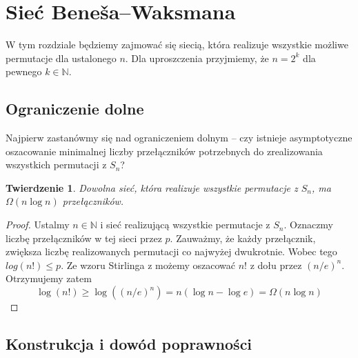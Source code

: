 \documentclass[a4paper]{article}
\newcommand{\todo}[1]{\begin{center} \fbox{TODO: #1} \end{center}}
\newcommand{\N}{\mathbb{N}}
\newtheorem{tw}{Twierdzenie}[section]
\theoremstyle{definition}
\newtheorem*{pyt}{Pytanie}
\begin{document}

\section{Sieć Beneša--Waksmana}

W tym rozdziale będziemy zajmować się siecią, która realizuje wszystkie możliwe permutacje dla ustalonego \(n\). Dla uproszczenia przyjmiemy, że $n = 2^k$ dla pewnego \(k \in \N\).


\subsection{Ograniczenie dolne}

Najpierw zastanówmy się nad ograniczeniem dolnym -- czy istnieje asymptotyczne oszacowanie minimalnej liczby przełączników potrzebnych do zrealizowania wszystkich permutacji z \(S_n\)?
 
\begin{tw}
    Dowolna sieć, która realizuje wszystkie permutacje z \(S_n\), ma  \(\Omega(n \log n )\) przełączników.
\end{tw}
\begin{proof}
Ustalmy $n \in \mathbb{N}$ i sieć realizującą wszystkie permutacje z \(S_n\). Oznaczmy liczbę przełączników w tej sieci przez \(p\).
Zauważmy, że każdy przełącznik, zwiększa liczbę realizowanych permutacji co najwyżej dwukrotnie.
Wobec tego $log(n!) \leq p$. Ze wzoru Stirlinga z możemy oszacować \(n!\) z dołu przez $(n/e)^n$. Otrzymujemy zatem
\[
    \log (n!) \geq \log ( (n/e)^n ) = n(\log n - \log e) = \Omega(n \log n)
\]
\end{proof}

\subsection{Konstrukcja i dowód poprawności}
\end{document}
